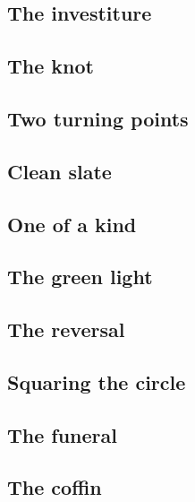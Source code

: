 \subsection{The investiture}


\subsection{The knot}


\subsection{Two turning points}


\subsection{Clean slate}



\subsection{One of a kind}


\subsection{The green light}


\subsection{The reversal}


\subsection{Squaring the circle}


\subsection{The funeral}


\subsection{The coffin}



